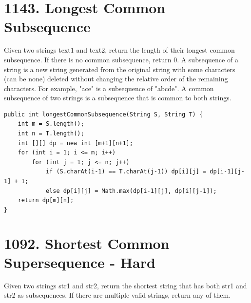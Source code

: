 \documentclass[9pt, b5paaper]{book}
\begin{document}
\section{1143. Longest Common Subsequence}
\label{sec-1-30}
Given two strings text1 and text2, return the length of their longest common subsequence. If there is no common subsequence, return 0.
A subsequence of a string is a new string generated from the original string with some characters (can be none) deleted without changing the relative order of the remaining characters.
For example, "ace" is a subsequence of "abcde".
A common subsequence of two strings is a subsequence that is common to both strings.
\begin{verbatim}
public int longestCommonSubsequence(String S, String T) {
    int m = S.length();
    int n = T.length();
    int [][] dp = new int [m+1][n+1];
    for (int i = 1; i <= m; i++) 
        for (int j = 1; j <= n; j++) 
            if (S.charAt(i-1) == T.charAt(j-1)) dp[i][j] = dp[i-1][j-1] + 1;
            else dp[i][j] = Math.max(dp[i-1][j], dp[i][j-1]);
    return dp[m][n];
}
\end{verbatim}

\section{1092. Shortest Common Supersequence - Hard}
\label{sec-1-31}
Given two strings str1 and str2, return the shortest string that has both str1 and str2 as subsequences. If there are multiple valid strings, return any of them.
\end{document}
